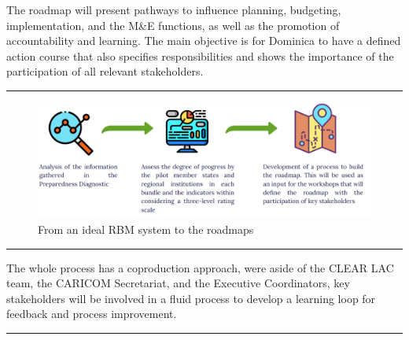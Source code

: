 \documentclass[
  10pt,
]{book}
\begin{document}
The roadmap will present pathways to influence planning, budgeting, implementation, and the M\&E functions, as well as the promotion of accountability and learning. The main objective is for Dominica to have a defined action course that also specifies responsibilities and shows the importance of the participation of all relevant stakeholders.

\begin{center}\rule{0.5\linewidth}{0.5pt}\end{center}

\begin{figure}

{\centering \includegraphics[width=1\linewidth]{./images/figure_6} 

}

\caption{From an ideal RBM system to the roadmaps}\label{fig:figure6}
\end{figure}

\begin{center}\rule{0.5\linewidth}{0.5pt}\end{center}

The whole process has a coproduction approach, were aside of the CLEAR LAC team, the CARICOM Secretariat, and the Executive Coordinators, key stakeholders will be involved in a fluid process to develop a learning loop for feedback and process improvement.

\begin{center}\rule{0.5\linewidth}{0.5pt}\end{center}
\end{document}
